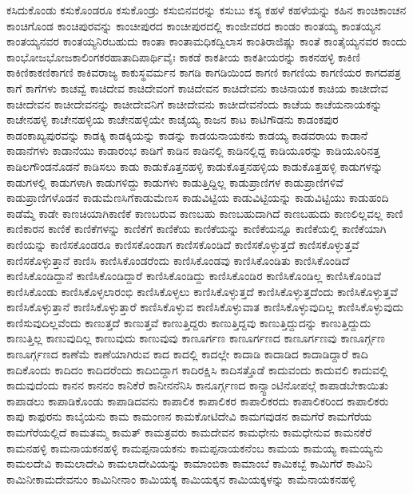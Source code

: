 {ಕಸಿದುಕೊಂಡು
ಕಸುಕೊಂಡರೂ
ಕಸುಕೊಂಡ್ರು
ಕಸುಬಿನವರನ್ನು
ಕಸುಬು
ಕಸ್ಯ
ಕಹಳೆ
ಕಹಳೆಯನ್ನು
ಕಹಿನ
ಕಾಂಚಿಕಾಂಚನ
ಕಾಂಚಿಗೊಂಡ
ಕಾಂಚಿಪುರವನ್ನು
ಕಾಂಚೀಪುರದ
ಕಾಂಚೀಪುರದಲ್ಲಿ
ಕಾಂಜೀವರದ
ಕಾಂಡಂ
ಕಾಂತಯ್ಯ
ಕಾಂತಯ್ಯನ
ಕಾಂತಯ್ಯನವರ
ಕಾಂತಯ್ಯನಿರಬಹುದು
ಕಾಂತಾ
ಕಾಂತಾಮಧಿಕದ್ವಿಲಾಸ
ಕಾಂತಿರಾಜಿಷ್ಣು
ಕಾಂತೆ
ಕಾಂತೈಯ್ಯನವರ
ಕಾಂದು
ಕಾಂಭೋಜಭೋಜಕಾಲಿಂಗಕರಹಾತಾದಿಪಾರ್ಥಿವೈಃ
ಕಾಕಡೆ
ಕಾಕತೀಯ
ಕಾಕತೀಯರನ್ನು
ಕಾಕನಹಳ್ಳಿ
ಕಾಕಿಣಿ
ಕಾಕಿಣಿಕಾಕಣಿಕಾಗಣಿ
ಕಾಕಿವರಾಜ್ಯ
ಕಾಕುಸ್ಥವರ್ಮನ
ಕಾಗಡಿ
ಕಾಗಡಿಯಿಂದ
ಕಾಗಣಿ
ಕಾಗಣಿಯ
ಕಾಗಣಿಯರ
ಕಾಗದಪತ್ರ
ಕಾಗೆ
ಕಾಗೆಗಳು
ಕಾಚವ್ವೆ
ಕಾಚಿದೇವ
ಕಾಚಿದೇವಂಗೆ
ಕಾಚಿದೇವನ
ಕಾಚಿದೇವನು
ಕಾಚಿನಾಯಕ
ಕಾಚಿಯ
ಕಾಚೀದೇವ
ಕಾಚೀದೇವನ
ಕಾಚೀದೇವನನ್ನು
ಕಾಚೀದೇವನಿಗೆ
ಕಾಚೀದೇವನು
ಕಾಚೀದೇವನೆಂದು
ಕಾಚೆಯ
ಕಾಚೆಯನಾಯಕನ್ನು
ಕಾಚೇನಹಳ್ಳಿ
ಕಾಚೇನಹಳ್ಳಿಯ
ಕಾಚೇನಹಳ್ಳಿಯೇ
ಕಾಚೈಯ್ಯ
ಕಾಜನ
ಕಾಟ
ಕಾಟಿಗೌಡನು
ಕಾಡಂಕಪುರ
ಕಾಡಂಕಾಖ್ಯಪುರವನ್ನು
ಕಾಡಕ್ಕಿ
ಕಾಡಕ್ಕಿಯನ್ನು
ಕಾಡನ್ನು
ಕಾಡಯನಾಯಕನು
ಕಾಡಯ್ಯ
ಕಾಡವರಾಯ
ಕಾಡಾನೆ
ಕಾಡಾನೆಗಳು
ಕಾಡಾನೆಯು
ಕಾಡಾರಂಭ
ಕಾಡಿಗೆ
ಕಾಡಿನ
ಕಾಡಿನಲ್ಲಿ
ಕಾಡಿನಲ್ಲಿದ್ದ
ಕಾಡಿಯೂರನ್ನು
ಕಾಡಿಯೂರಿನತ್ತ
ಕಾಡಿಲಗೌಂಡನೊಡನೆ
ಕಾಡಿಸಲು
ಕಾಡು
ಕಾಡುಕೊತ್ತನಹಳ್ಳಿ
ಕಾಡುಕೊತ್ತನಹಳ್ಳಿಯ
ಕಾಡುಕೊತ್ತಹಳ್ಳಿ
ಕಾಡುಗಳನ್ನು
ಕಾಡುಗಳಲ್ಲಿ
ಕಾಡುಗಳಾಗಿ
ಕಾಡುಗಳಿದ್ದು
ಕಾಡುಗಳು
ಕಾಡುತ್ತಿದ್ದಿಲ್ಲ
ಕಾಡುಪ್ರಾಣಿಗಳ
ಕಾಡುಪ್ರಾಣಿಗಳಿವೆ
ಕಾಡುಪ್ರಾಣಿಗಳೊಡನೆ
ಕಾಡುಮೆಣಸಿಗೆಕಾಡುಮೆಣಸ
ಕಾಡುವಿಟ್ಟಿಯ
ಕಾಡುವಿಟ್ಟಿಯನ್ನು
ಕಾಡುವಿಟ್ಟಿಯು
ಕಾಡುಹಂದಿ
ಕಾಡೆಮ್ಮೆ
ಕಾಡೇ
ಕಾಣಚಿಯಾಗಿಕಾಣಿಕೆ
ಕಾಣಬರುವ
ಕಾಣಬಹು
ಕಾಣಬಹುದಾಗಿದೆ
ಕಾಣಬಹುದು
ಕಾಣಲಿಲ್ಲವಲ್ಲ
ಕಾಣಿ
ಕಾಣಿಕಾರನ
ಕಾಣಿಕೆ
ಕಾಣಿಕೆಗಳನ್ನು
ಕಾಣಿಕೆಗೆ
ಕಾಣಿಕೆಯ
ಕಾಣಿಕೆಯನ್ನು
ಕಾಣಿಕೆಯನ್ನೂ
ಕಾಣಿಕೆಯಲ್ಲಿ
ಕಾಣಿಕೆಯಾಗಿ
ಕಾಣಿಯನ್ನು
ಕಾಣಿಸಕೊಂಡರೂ
ಕಾಣಿಸಕೊಂಡಾಗ
ಕಾಣಿಸಕೊಂಡಿದೆ
ಕಾಣಿಸಕೊಳ್ಳುತ್ತದೆ
ಕಾಣಿಸಕೊಳ್ಳುತ್ತವೆ
ಕಾಣಿಸಕೊಳ್ಳುತ್ತಾನೆ
ಕಾಣಿಸಿ
ಕಾಣಿಸಿಕೊಂಡರೆಂದು
ಕಾಣಿಸಿಕೊಂಡವು
ಕಾಣಿಸಿಕೊಂಡಿತು
ಕಾಣಿಸಿಕೊಂಡಿದೆ
ಕಾಣಿಸಿಕೊಂಡಿದ್ದಾನೆ
ಕಾಣಿಸಿಕೊಂಡಿದ್ದಾರೆ
ಕಾಣಿಸಿಕೊಂಡಿದ್ದು
ಕಾಣಿಸಿಕೊಂಡಿರ
ಕಾಣಿಸಿಕೊಂಡಿಲ್ಲ
ಕಾಣಿಸಿಕೊಂಡಿವೆ
ಕಾಣಿಸಿಕೊಂಡು
ಕಾಣಿಸಿಕೊಳ್ಳಲಾರಂಭಿ
ಕಾಣಿಸಿಕೊಳ್ಳಲು
ಕಾಣಿಸಿಕೊಳ್ಳುತ್ತದೆ
ಕಾಣಿಸಿಕೊಳ್ಳುತ್ತದೆಂದು
ಕಾಣಿಸಿಕೊಳ್ಳುತ್ತವೆ
ಕಾಣಿಸಿಕೊಳ್ಳುತ್ತಾನೆ
ಕಾಣಿಸಿಕೊಳ್ಳುತ್ತಾರೆ
ಕಾಣಿಸಿಕೊಳ್ಳುವ
ಕಾಣಿಸಿಕೊಳ್ಳುವಾತ
ಕಾಣಿಸಿಕೊಳ್ಳುವುದಿಲ್ಲ
ಕಾಣಿಸಿಕೊಳ್ಳುವುದು
ಕಾಣಿಸುವುದಿಲ್ಲವೆಂದು
ಕಾಣುತ್ತದೆ
ಕಾಣುತ್ತವೆ
ಕಾಣುತ್ತಿದ್ದರು
ಕಾಣುತ್ತಿದ್ದವು
ಕಾಣುತ್ತಿದ್ದುದನ್ನು
ಕಾಣುತ್ತಿದ್ದುದು
ಕಾಣುತ್ತಿಲ್ಲ
ಕಾಣುವುದಿಲ್ಲ
ಕಾಣುವುದು
ಕಾಣುವುವು
ಕಾಣೂರ್ಗಣ
ಕಾಣೂರ್ಗಣದ
ಕಾಣೂರ್ಗಣವು
ಕಾಣೂರ್ಗ್ಗಣ
ಕಾಣೂರ್ಗ್ಗಣದ
ಕಾಣೆಮೆ
ಕಾಣೆಯಾಗಿರುವ
ಕಾದ
ಕಾದಲ್ಲಿ
ಕಾದಲ್ಲೇ
ಕಾದಾಡಿ
ಕಾದಾಡಿದ
ಕಾದಾಡಿದ್ದಾರೆ
ಕಾದಿ
ಕಾದಿಕೊಂದು
ಕಾದಿದಂ
ಕಾದಿದರೆಂದು
ಕಾದಿಬಿದ್ದಾಗ
ಕಾದಿರಕ್ಷಿಸಿ
ಕಾದಿಸತ್ತೊಡೆ
ಕಾದುವಂದು
ಕಾದುವಲಿ
ಕಾದುವಲ್ಲಿ
ಕಾದುವುದೆಂದು
ಕಾನನ
ಕಾನನಂ
ಕಾನಿಕೆರೆ
ಕಾನೀನನೆನಿಸಿ
ಕಾನೂರ್ಗ್ಗಣದ
ಕಾನ್ಸ್ಟಾಂಟಿನೋಪಲ್ಗೆ
ಕಾಪಾಡಬೇಕಾಯಿತು
ಕಾಪಾಡಲು
ಕಾಪಾಡಿಕೊಂಡು
ಕಾಪಾಡಿದವನು
ಕಾಪಾಲಿಕ
ಕಾಪಾಲಿಕರ
ಕಾಪಾಲಿಕರದು
ಕಾಪಾಲಿಕರಿಂದ
ಕಾಪಾಲಿಕರು
ಕಾಪು
ಕಾಫುರನು
ಕಾಬೈಯನು
ಕಾಮ
ಕಾಮಂಣನ
ಕಾಮಕೋಟಿದೇವಿ
ಕಾಮಗವುಡನ
ಕಾಮಗೆರೆ
ಕಾಮಗೆರೆಯ
ಕಾಮಗೆರೆಯಲ್ಲಿದೆ
ಕಾಮತಮ್ಮ
ಕಾಮತ್
ಕಾಮತ್ರವರು
ಕಾಮದೇವನ
ಕಾಮಧೇನು
ಕಾಮಧೇನುವ
ಕಾಮನಕೆರೆ
ಕಾಮನಹಳ್ಳಿ
ಕಾಮನಾಯಕನಹಳ್ಳಿ
ಕಾಮಪ್ಪನಾಯಕನು
ಕಾಮಪ್ಪನಾಯಕನೆಂಬ
ಕಾಮಯ
ಕಾಮಯ್ಯ
ಕಾಮಯ್ಯನು
ಕಾಮಲದೇವಿ
ಕಾಮಲಾದೇವಿ
ಕಾಮಲಾದೇವಿಯನ್ನು
ಕಾಮಾಂಬಿಕಾ
ಕಾಮಾಂಬೆ
ಕಾಮಿಕಬ್ಬೆ
ಕಾಮಿಗೆರೆ
ಕಾಮಿನಿ
ಕಾಮಿನೀಕಾಮದೇವನುಂ
ಕಾಮಿನೀನಾಂ
ಕಾಮಿಯಕ್ಕ
ಕಾಮಿಯಕ್ಕನ
ಕಾಮಿಯಕ್ಕಳನ್ನು
ಕಾಮೆನಾಯಕನಹಳ್ಳಿ
}
